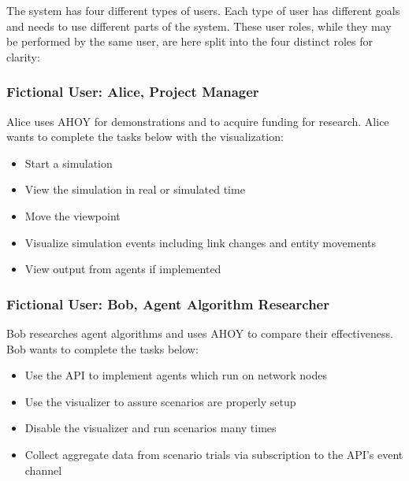 \documentclass[titlepage]{article}
\begin{document}
The system has four different types of users.  Each type of user has different goals and needs to use different parts of the system.  These user roles, while they may be performed by the same user, are here split into the four distinct roles for clarity:


\subsubsection{Fictional User: Alice, Project Manager%
  \label{alice}%
}

Alice uses AHOY for demonstrations and to acquire funding for research.  Alice wants to complete the tasks below with
the visualization:

\begin{itemize}
    \item Start a simulation
    \item View the simulation in real or simulated time
    \item Move the viewpoint
    \item Visualize simulation events including link changes and entity movements
    \item View output from agents if implemented
\end{itemize}

%    

\subsubsection{Fictional User: Bob, Agent Algorithm Researcher%
  \label{bob}%
}

Bob researches agent algorithms and uses AHOY to compare their effectiveness.  Bob wants to complete the tasks below:

\begin{itemize}
    \item Use the API to implement agents which run on network nodes
    \item Use the visualizer to assure scenarios are properly setup
    \item Disable the visualizer and run scenarios many times
    \item Collect aggregate data from scenario trials via subscription to the API's event channel
\end{itemize}
\end{document}
